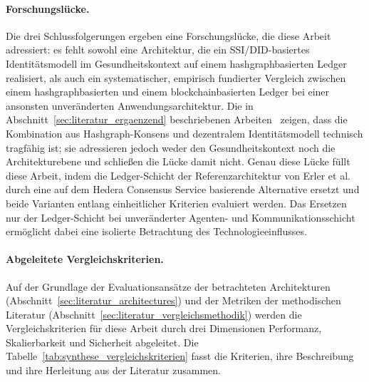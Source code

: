 \paragraph{Forschungslücke.}
Die drei Schlussfolgerungen ergeben eine Forschungslücke, die diese Arbeit adressiert: es fehlt sowohl eine Architektur, die ein SSI/DID-basiertes Identitätsmodell im Gesundheitskontext auf einem hashgraphbasierten Ledger realisiert, als auch ein systematischer, empirisch fundierter Vergleich zwischen einem hashgraphbasierten und einem blockchainbasierten Ledger bei einer ansonsten unveränderten Anwendungsarchitektur. Die in Abschnitt~\ref{sec:literatur_ergaenzend} beschriebenen Arbeiten~\cite{satybaldy2026, cadiz2025} zeigen, dass die Kombination aus Hashgraph-Konsens und dezentralem Identitätsmodell technisch tragfähig ist; sie adressieren jedoch weder den Gesundheitskontext noch die Architekturebene und schließen die Lücke damit nicht. Genau diese Lücke füllt diese Arbeit, indem die Ledger-Schicht der Referenzarchitektur von Erler et al.~\cite{erler2023} durch eine auf dem Hedera Consensus Service basierende Alternative ersetzt und beide Varianten entlang einheitlicher Kriterien evaluiert werden. Das Ersetzen nur der Ledger-Schicht bei unveränderter Agenten- und Kommunikationsschicht ermöglicht dabei eine isolierte Betrachtung des Technologieeinflusses.

\paragraph{Abgeleitete Vergleichskriterien.}
Auf der Grundlage der Evaluationsansätze der betrachteten Architekturen (Abschnitt~\ref{sec:literatur_architectures}) und der Metriken der methodischen Literatur (Abschnitt~\ref{sec:literatur_vergleichsmethodik}) werden die Vergleichskriterien für diese Arbeit durch drei Dimensionen Performanz, Skalierbarkeit und Sicherheit abgeleitet. Die Tabelle~\ref{tab:synthese_vergleichskriterien} fasst die Kriterien, ihre Beschreibung und ihre Herleitung aus der Literatur zusammen.

